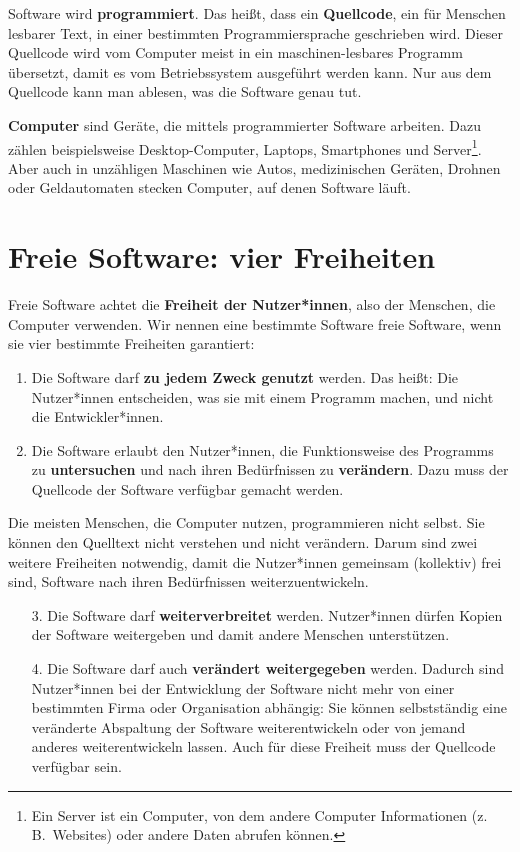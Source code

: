\documentclass[a5paper,12pt]{scrartcl}
\begin{document}
Software wird \textbf{programmiert}. Das heißt, dass ein
\textbf{Quellcode}, ein für Menschen lesbarer Text, in einer
bestimmten Programmiersprache geschrieben wird. Dieser Quellcode wird
vom Computer meist in ein maschinen-lesbares Programm übersetzt, damit
es vom Betriebssystem ausgeführt werden kann. Nur aus dem Quellcode
kann man ablesen, was die Software genau tut.

\textbf{Computer} sind Geräte, die mittels programmierter Software
arbeiten. Dazu zählen beispielsweise Desktop-Computer, Laptops,
Smartphones und Server\footnote{Ein Server ist ein Computer, von dem
  andere Computer Informationen (z.\,B.\ Websites) oder andere Daten
  abrufen können.}. Aber auch in unzähligen Maschinen wie Autos,
medizinischen Geräten, Drohnen oder Geldautomaten stecken Computer,
auf denen Software läuft.


\section{Freie Software: vier Freiheiten}

Freie Software achtet die \textbf{Freiheit der Nutzer*innen}, also der
Menschen, die Computer verwenden. Wir nennen eine bestimmte Software
freie Software, wenn sie vier bestimmte Freiheiten garantiert:
\begin{enumerate}
\item Die Software darf \textbf{zu jedem Zweck genutzt} werden. Das
  heißt: Die Nutzer*innen entscheiden, was sie mit einem Programm
  machen, und nicht die Entwickler*innen.
\item Die Software erlaubt den Nutzer*innen, die Funktionsweise des
  Programms zu \textbf{untersuchen} und nach ihren Bedürfnissen zu
  \textbf{verändern}. Dazu muss der Quellcode der Software verfügbar gemacht werden.
\end{enumerate}

Die meisten Menschen, die Computer nutzen, programmieren nicht
selbst. Sie können den Quelltext nicht verstehen und nicht
verändern. Darum sind zwei weitere Freiheiten notwendig, damit die
Nutzer*innen gemeinsam (kollektiv) frei sind, Software nach ihren
Bedürfnissen weiterzuentwickeln.

\begin{enumerate}
\item[3.] Die Software darf \textbf{weiterverbreitet}
  werden. Nutzer*innen dürfen Kopien der Software weitergeben und
  damit andere Menschen unterstützen.
\item[4.] Die Software darf auch \textbf{verändert weitergegeben}
  werden. Dadurch sind Nutzer*innen bei der Entwicklung der Software
  nicht mehr von einer bestimmten Firma oder Organisation abhängig:
  Sie können selbstständig eine veränderte Abspaltung der Software
  weiterentwickeln oder von jemand anderes weiterentwickeln
  lassen. Auch für diese Freiheit muss der Quellcode verfügbar sein.
\end{enumerate}
\end{document}
